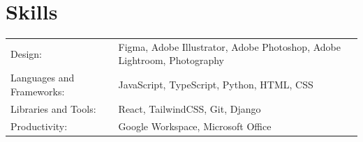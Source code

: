 \documentclass[a4paper, 10pt]{article}
\begin{document}
\section{Skills}
\begin{tabularx}{\linewidth}{@{}l X@{}}
Design: &  \normalsize{Figma, Adobe Illustrator, Adobe Photoshop, Adobe Lightroom, Photography}\\
Languages and Frameworks: &  \normalsize{JavaScript, TypeScript, Python, HTML, CSS}\\
Libraries and Tools: &  \normalsize{React, TailwindCSS, Git, Django}\\
Productivity: &  \normalsize{Google Workspace, Microsoft Office}\\
\end{tabularx}
\end{document}
